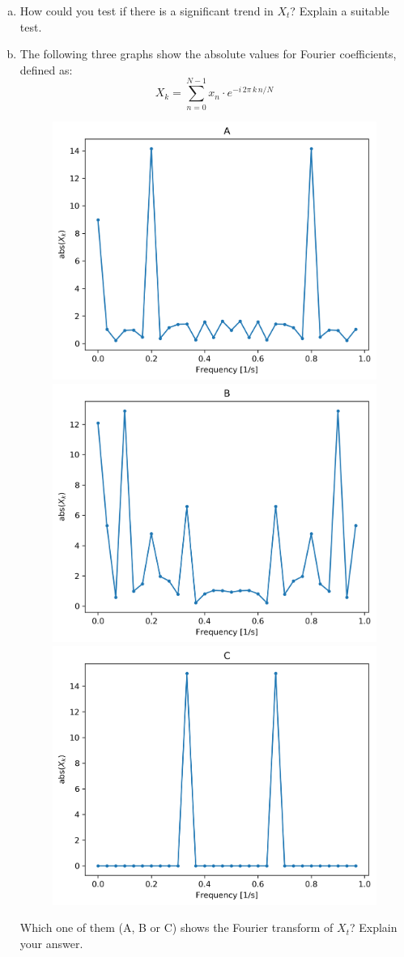 \documentclass[12pt]{article}
\begin{document}
\begin{enumerate}[(a)]
\item How could you test if there is a significant trend in $X_t$? Explain a suitable test.

\item The following three graphs show the absolute values for Fourier coefficients, defined as:
$$ X_k = \sum_{n=0}^{N-1} x_n \cdot e^{-i \, 2 \pi \, k \, n/N} $$

\begin{figure}[h!]
    \centering
    \includegraphics[width=.3\textwidth]{./fourier_figures/Fourier_A}
	\includegraphics[width=.3\textwidth]{./fourier_figures/Fourier_B}
	\includegraphics[width=.3\textwidth]{./fourier_figures/Fourier_C} 
\end{figure}
Which one of them (A, B or C) shows the Fourier transform of $X_t$? Explain your answer.


\end{enumerate}




%
\end{document}
